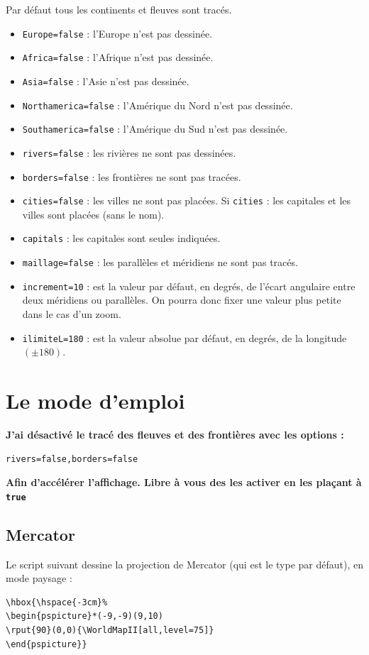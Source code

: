 \documentclass[11pt,french,BCOR10mm,DIV12,bibliography=totoc,parskip=false,
   smallheadings, headexclude,footexclude,oneside]{pst-doc}
\let\Parameter\texttt
\begin{document}
Par défaut tous les continents et fleuves sont tracés.
\begin{itemize}
\item \Parameter{Europe=false} : l'Europe n'est pas dessinée.
\item \Parameter{Africa=false} : l'Afrique n'est pas dessinée.
\item \Parameter{Asia=false} : l'Asie n'est pas dessinée.
\item \Parameter{Northamerica=false} : l'Amérique du Nord n'est pas dessinée.
\item \Parameter{Southamerica=false} : l'Amérique du Sud n'est pas dessinée.
\item \Parameter{rivers=false} : les rivières ne sont pas dessinées.
\item \Parameter{borders=false} : les frontières ne sont pas
tracées.
\item \Parameter{cities=false} : les villes ne sont pas
placées. Si \Parameter{cities} : les capitales et les villes sont placées
(sans le nom).
\item \Parameter{capitals} : les capitales sont seules indiquées.
\item \Parameter{maillage=false} : les parallèles et méridiens ne sont pas tracés.
\item \Parameter{increment=10} : est la valeur par défaut, en degrés, de l'écart angulaire entre deux
méridiens ou parallèles. On pourra donc fixer une valeur plus petite dans le cas
d'un zoom.
\item \Parameter{ilimiteL=180} : est la valeur absolue par défaut, en degrés, de
la longitude $(\pm 180)$.
\end{itemize}
\section{Le mode d'emploi}
\textbf{J'ai désactivé le tracé des fleuves et des frontières avec les options
:}
\begin{verbatim}
rivers=false,borders=false
\end{verbatim}
\textbf{Afin d'accélérer l'affichage. Libre à vous des les activer en les plaçant à
\texttt{true}}
\subsection{Mercator}
Le script suivant dessine la projection de Mercator (qui est le type par défaut), en mode paysage :
\begin{verbatim}
\hbox{\hspace{-3cm}%
\begin{pspicture}*(-9,-9)(9,10)
\rput{90}(0,0){\WorldMapII[all,level=75]}
\end{pspicture}}
\end{verbatim}
\end{document}
